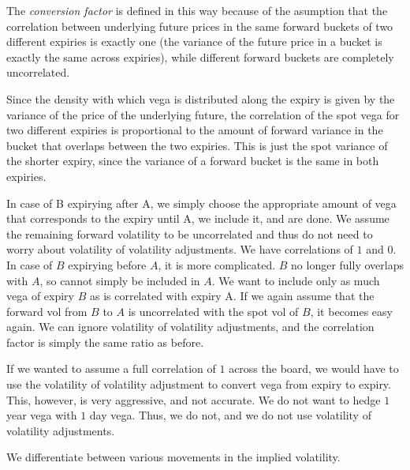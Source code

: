 \documentclass[10pt, a4paper, oneside]{article}
\begin{document}
\noindent The \emph{conversion factor} is defined in this way because of the asumption that the correlation between underlying future prices in the same forward buckets of two different expiries is exactly one (the variance of the future price in a bucket is exactly the same
across expiries), while different forward buckets are completely uncorrelated.


\noindent Since the density with which vega is distributed along the expiry is given by the variance of the price of the underlying future, the correlation of the spot vega for two different expiries is proportional to the amount of forward variance in the bucket that
overlaps between the two expiries. This is just the spot variance of the shorter expiry, since the variance of a forward bucket is the same in both expiries.

\noindent In case of B expirying after A, we simply choose the appropriate amount of vega that corresponds to the expiry until A, we include it, and are done. We assume the remaining forward volatility to be uncorrelated and thus do not need to worry about
volatility of volatility adjustments. We have correlations of $1$ and $0$. In case of $B$ expirying before $A$, it is more complicated. $B$ no longer fully overlaps with $A$, so cannot simply be included in $A$. We want to include only as much vega of expiry $B$ as is
correlated with expiry A. If we again assume that the forward vol from $B$ to $A$ is uncorrelated with the spot vol of $B$, it becomes easy again. We can ignore volatility of volatility adjustments, and the correlation factor is simply the same ratio as before.

\noindent If we wanted to assume a full correlation of $1$ across the board, we would have to use the volatility of volatility adjustment to convert vega from expiry to expiry. This, however, is very aggressive, and not accurate. We do not want to hedge $1$ year vega
with $1$ day vega. Thus, we do not, and we do not use volatility of volatility adjustments.

\noindent We differentiate between various movements in the implied volatility.
\end{document}
